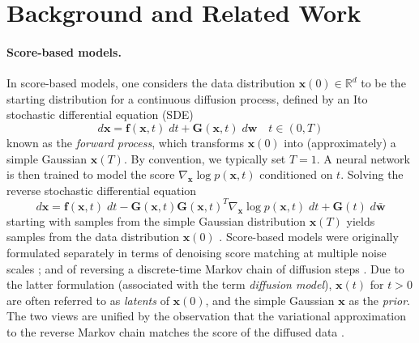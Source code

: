 \documentclass{article}
\begin{document}
\section{Background and Related Work} \label{sec:background}

\paragraph{\textbf{Score-based models.}} In score-based models, one considers the data distribution $\mathbf{x}(0) \in \mathbb{R}^d$ to be the starting distribution for a continuous diffusion process, defined by an Ito stochastic differential equation (SDE)
\begin{equation} \label{eq:forward}
    d\mathbf{x} = \mathbf{f}(\mathbf{x}, t)\;dt + \mathbf{G}(\mathbf{x}, t)\;d\mathbf{w} \quad t \in (0, T)
\end{equation}
known as the \emph{forward process}, which transforms $\mathbf{x}(0)$ into (approximately) a simple Gaussian $\mathbf{x}(T)$. By convention, we typically set $T=1$. A neural network is then trained to model the score $\nabla_\mathbf{x} \log p(\mathbf{x}, t)$ conditioned on $t$. Solving the reverse stochastic differential equation
\begin{equation} \label{eq:reverse}
    d\mathbf{x} = \mathbf{f}(\mathbf{x}, t)\;dt - \mathbf{G}(\mathbf{x}, t)\mathbf{G}(\mathbf{x}, t)^T\nabla_\mathbf{x} \log p(\mathbf{x}, t) \; dt + \mathbf{G}(t) \;d\mathbf{\bar{w}}   
\end{equation}
starting with samples from the simple Gaussian distribution $\mathbf{x}(T)$ yields samples from the data distribution $\mathbf{x}(0)$ \cite{song2021score,anderson1982reverse}. Score-based models were originally  formulated separately in terms of denoising score matching at multiple noise scales \cite{song2019generative}; and of reversing a discrete-time Markov chain of diffusion steps \cite{ho2020denoising}. Due to the latter formulation (associated with the term \emph{diffusion model}), $\mathbf{x}(t)$ for $t > 0$ are often referred to as \emph{latents} of $\mathbf{x}(0)$, and the simple Gaussian $\mathbf{x}$ as the \emph{prior}. The two views are unified by the observation that the variational approximation to the reverse Markov chain matches the score of the diffused data \cite{song2021score}.
\end{document}
